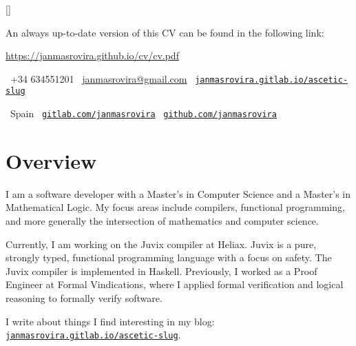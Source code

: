 \documentclass[11pt]{article}
\begin{document}
\par{\bigskip\par}
\titleformat{\section}{\Large\scshape\raggedright}{}{0em}{}[\titlerule]

An always up-to-date version of this CV can be found in the following link:
\begin{center}
\url{https://janmasrovira.github.io/cv/cv.pdf}
\end{center}

\vspace{0.4cm}

\begin{center}
    \hfill
    \faPhone\ +34 634551201
    \hfill
    \faEnvelope\ \href{mailto:janmasrovira@gmail.com}{janmasrovira@gmail.com}
    \hfill
    \faGlobe\ \href{https://janmasrovira.gitlab.io/ascetic-slug/}{\texttt{janmasrovira.gitlab.io/ascetic-slug}}
    \hspace*{\fill}
    \\
    \vspace{0.1cm}

    \hfill
    \faMapMarker\ Spain
    \hfill
    \faGitlab\ \href{https://gitlab.com/janmasrovira}{\texttt{gitlab.com/janmasrovira}}
    \hfill
    \faGithub\ \href{https://github.com/janmasrovira}{\texttt{github.com/janmasrovira}}
    \hspace*{\fill}
\end{center}

\section{Overview}

I am a software developer with a Master's in Computer Science and a Master's in
Mathematical Logic. My focus areas include compilers, functional programming,
and more generally the intersection of mathematics and computer science.

Currently, I am working on the Juvix compiler at Heliax. Juvix is a pure,
strongly typed, functional programming language with a focus on safety. The Juvix compiler is implemented in Haskell.
Previously, I worked as a Proof Engineer at Formal Vindications, where I applied
formal verification and logical reasoning to formally verify software.

I write about things I find interesting in my blog: \href{https://janmasrovira.gitlab.io/ascetic-slug/}{\texttt{janmasrovira.gitlab.io/ascetic-slug}}.
\end{document}
